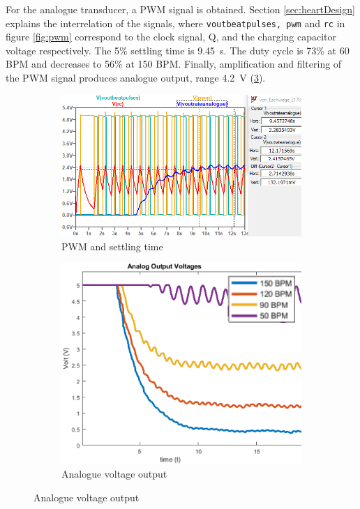 For the analogue transducer, a PWM signal is obtained. Section \ref{sec:heartDesign} explains the interrelation of the signals, where \texttt{voutbeatpulses, pwm} and \texttt{rc} in figure \ref{fig:pwm} correspond to the clock signal, Q, and the charging capacitor voltage respectively. The 5\% settling time is \SI{9.45}{s}. The duty cycle is 73\% at 60 BPM and decreases to 56\% at 150 BPM. Finally, amplification and filtering of the PWM signal produces analogue output, range \SI{4.2}{V} (\ref{subfig:analog}).

\begin{figure}[h]
 \footnotesize
   \centering
   \begin{subfigure}[]{0.57\textwidth}
        \includegraphics[width=\linewidth]{./Figures/pwm}
	  \caption{PWM and settling time} 
	  \label{subfig:pwm}	
   \end{subfigure}
   \begin{subfigure}[]{0.41\textwidth}
  	 \includegraphics[width=\linewidth]{./Figures/analog}
	  \caption{Analogue voltage output} 
	  \label{subfig:analog}	
   \end{subfigure}
 \end{figure}
 
